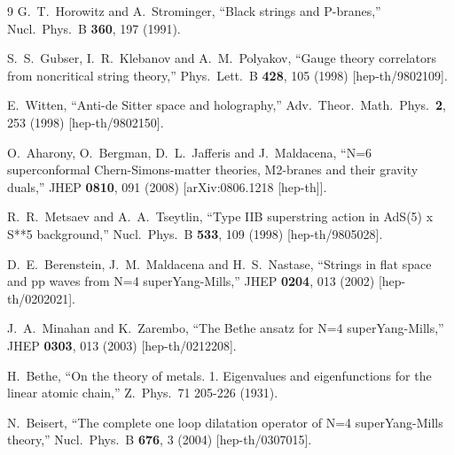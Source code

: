\documentclass[a4paper]{article}
\numberwithin{equation}{section}
\begin{document}
\begin{thebibliography} {9}
  G.~T.~Horowitz and A.~Strominger,
  ``Black strings and P-branes,''
  Nucl.\ Phys.\ B {\bf 360}, 197 (1991).
  
  S.~S.~Gubser, I.~R.~Klebanov and A.~M.~Polyakov,
  ``Gauge theory correlators from noncritical string theory,''
  Phys.\ Lett.\ B {\bf 428}, 105 (1998)
  [hep-th/9802109].
  
  E.~Witten,
  ``Anti-de Sitter space and holography,''
  Adv.\ Theor.\ Math.\ Phys.\  {\bf 2}, 253 (1998)
  [hep-th/9802150].
  
  O.~Aharony, O.~Bergman, D.~L.~Jafferis and J.~Maldacena,
  ``N=6 superconformal Chern-Simons-matter theories, M2-branes and their gravity duals,''
  JHEP {\bf 0810}, 091 (2008)
  [arXiv:0806.1218 [hep-th]].
  
  R.~R.~Metsaev and A.~A.~Tseytlin,
  ``Type IIB superstring action in AdS(5) x S**5 background,''
  Nucl.\ Phys.\ B {\bf 533}, 109 (1998)
  [hep-th/9805028].
  
  D.~E.~Berenstein, J.~M.~Maldacena and H.~S.~Nastase,
  ``Strings in flat space and pp waves from N=4 superYang-Mills,''
  JHEP {\bf 0204}, 013 (2002)
  [hep-th/0202021].
  
  J.~A.~Minahan and K.~Zarembo,
  ``The Bethe ansatz for N=4 superYang-Mills,''
  JHEP {\bf 0303}, 013 (2003)
  [hep-th/0212208].
  
  H.~Bethe, 
  ``On the theory of metals. 1. Eigenvalues and eigenfunctions for the linear atomic chain,''
  Z.\ Phys.\ 71 205-226 (1931).
  
  N.~Beisert,
  ``The complete one loop dilatation operator of N=4 superYang-Mills theory,''
  Nucl.\ Phys.\ B {\bf 676}, 3 (2004)
  [hep-th/0307015].
  

\end{thebibliography}
\end{document}
